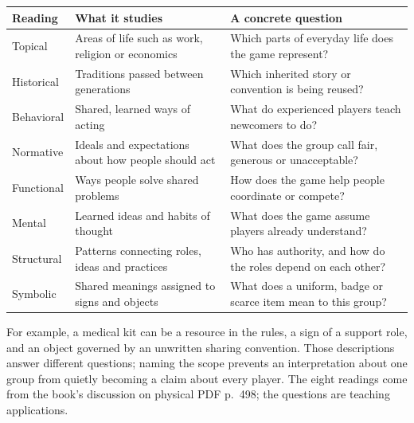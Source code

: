 {\def\LTcaptype{none} %
\begin{longtable}[]{@{}
  >{\raggedright\arraybackslash}p{}
  >{\raggedright\arraybackslash}p{}
  >{\raggedright\arraybackslash}p{}@{}}
\toprule\noalign{}
\begin{minipage}[b]{\linewidth}\raggedright
Reading
\end{minipage} & \begin{minipage}[b]{\linewidth}\raggedright
What it studies
\end{minipage} & \begin{minipage}[b]{\linewidth}\raggedright
A concrete question
\end{minipage} \\
\midrule\noalign{}
\endhead
\bottomrule\noalign{}
\endlastfoot
Topical & Areas of life such as work, religion or economics & Which parts of everyday life does the game represent? \\
Historical & Traditions passed between generations & Which inherited story or convention is being reused? \\
Behavioral & Shared, learned ways of acting & What do experienced players teach newcomers to do? \\
Normative & Ideals and expectations about how people should act & What does the group call fair, generous or unacceptable? \\
Functional & Ways people solve shared problems & How does the game help people coordinate or compete? \\
Mental & Learned ideas and habits of thought & What does the game assume players already understand? \\
Structural & Patterns connecting roles, ideas and practices & Who has authority, and how do the roles depend on each other? \\
Symbolic & Shared meanings assigned to signs and objects & What does a uniform, badge or scarce item mean to this group? \\
\end{longtable}
}

For example, a medical kit can be a resource in the rules, a sign of a support role, and an object governed by an unwritten sharing convention. Those descriptions answer different questions; naming the scope prevents an interpretation about one group from quietly becoming a claim about every player. The eight readings come from the book's discussion on physical PDF p.~498; the questions are teaching applications.

